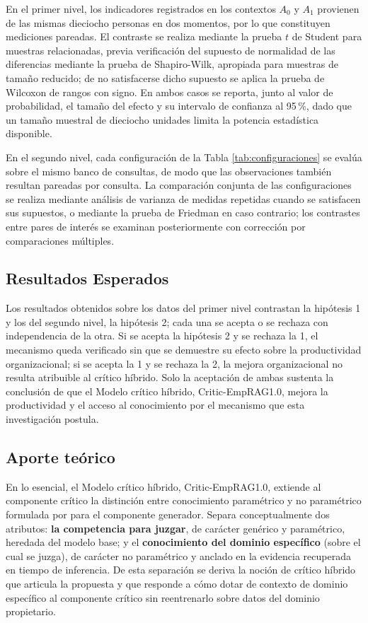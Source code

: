 En el primer nivel, los indicadores registrados en los contextos $A_0$ y $A_1$ provienen de las mismas dieciocho personas en dos momentos, por lo que constituyen mediciones pareadas. El contraste se realiza mediante la prueba $t$ de Student para muestras relacionadas, previa verificación del supuesto de normalidad de las diferencias mediante la prueba de Shapiro-Wilk, apropiada para muestras de tamaño reducido; de no satisfacerse dicho supuesto se aplica la prueba de Wilcoxon de rangos con signo. En ambos casos se reporta, junto al valor de probabilidad, el tamaño del efecto y su intervalo de confianza al 95\,\%, dado que un tamaño muestral de dieciocho unidades limita la potencia estadística disponible.

En el segundo nivel, cada configuración de la Tabla \ref{tab:configuraciones} se evalúa sobre el mismo banco de consultas, de modo que las observaciones también resultan pareadas por consulta. La comparación conjunta de las configuraciones se realiza mediante análisis de varianza de medidas repetidas cuando se satisfacen sus supuestos, o mediante la prueba de Friedman en caso contrario; los contrastes entre pares de interés se examinan posteriormente con corrección por comparaciones múltiples.

\subsection{Resultados Esperados}
Los resultados obtenidos sobre los datos del primer nivel contrastan la hipótesis 1 y los del segundo nivel, la hipótesis 2; cada una se acepta o se rechaza con independencia de la otra. Si se acepta la hipótesis 2 y se rechaza la 1, el mecanismo queda verificado sin que se demuestre su efecto sobre la productividad organizacional; si se acepta la 1 y se rechaza la 2, la mejora organizacional no resulta atribuible al crítico híbrido. Solo la aceptación de ambas sustenta la conclusión de que el Modelo crítico híbrido, Critic-EmpRAG1.0, mejora la productividad y el acceso al conocimiento por el mecanismo que esta investigación postula.


\subsection*{Aporte teórico}

En lo esencial, el Modelo crítico híbrido, Critic-EmpRAG1.0, extiende al componente crítico la distinción entre conocimiento paramétrico y no paramétrico formulada por \textcite{Lewis2020rag} para el componente generador. Separa conceptualmente dos atributos: \textbf{la competencia para juzgar}, de carácter genérico y paramétrico, heredada del modelo base; y el \textbf{conocimiento del dominio específico} (sobre el cual se juzga), de carácter no paramétrico y anclado en la evidencia recuperada en tiempo de inferencia. De esta separación se deriva la noción de crítico híbrido que articula la propuesta y que responde a cómo dotar de contexto de dominio específico al componente crítico sin reentrenarlo sobre datos del dominio propietario.

